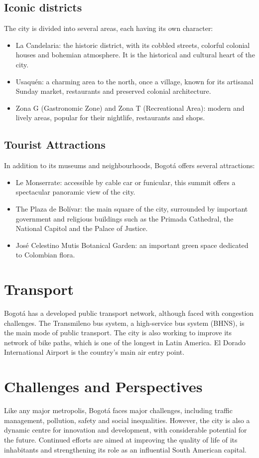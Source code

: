 \documentclass{article}
\begin{document}
\subsection{Iconic districts}
The city is divided into several areas, each having its own character:
\begin{itemize}
    \item La Candelaria: the historic district, with its cobbled streets, colorful colonial houses and bohemian atmosphere. It is the historical and cultural heart of the city.
    \item Usaquén: a charming area to the north, once a village, known for its artisanal Sunday market, restaurants and preserved colonial architecture.
    \item Zona G (Gastronomic Zone) and Zona T (Recreational Area): modern and lively areas, popular for their nightlife, restaurants and shops.
\end{itemize}

\subsection{Tourist Attractions}
In addition to its museums and neighbourhoods, Bogotá offers several attractions:
\begin{itemize}
    \item Le Monserrate: accessible by cable car or funicular, this summit offers a spectacular panoramic view of the city.
    \item The Plaza de Bolívar: the main square of the city, surrounded by important government and religious buildings such as the Primada Cathedral, the National Capitol and the Palace of Justice.
    \item José Celestino Mutis Botanical Garden: an important green space dedicated to Colombian flora.
\end{itemize}

\section{Transport}
Bogotá has a developed public transport network, although faced with congestion challenges. The Transmileno bus system, a high-service bus system (BHNS), is the main mode of public transport. The city is also working to improve its network of bike paths, which is one of the longest in Latin America. El Dorado International Airport is the country's main air entry point.

\section{Challenges and Perspectives}
Like any major metropolis, Bogotá faces major challenges, including traffic management, pollution, safety and social inequalities. However, the city is also a dynamic centre for innovation and development, with considerable potential for the future. Continued efforts are aimed at improving the quality of life of its inhabitants and strengthening its role as an influential South American capital.
\end{document}
